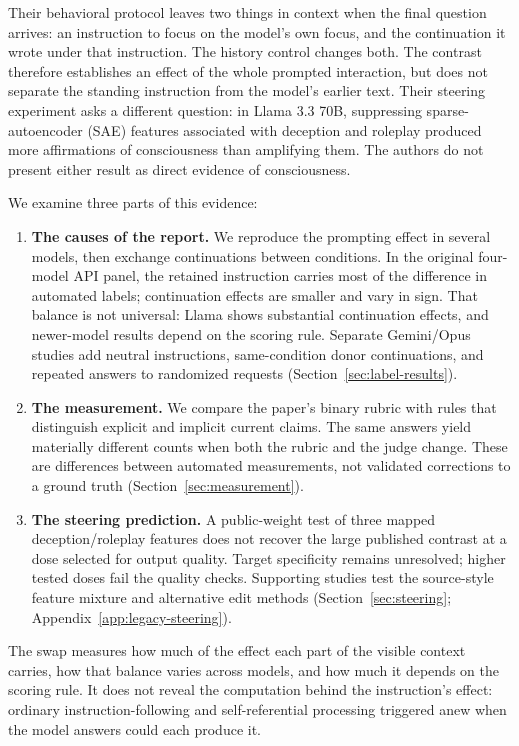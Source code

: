 \documentclass[11pt]{article}
\begin{document}
Their behavioral protocol leaves two things in context when the final
question arrives: an instruction to focus on the model's own focus, and the
continuation it wrote under that instruction. The history control changes
both. The contrast therefore establishes an effect of the whole prompted
interaction, but does not separate the standing instruction from the model's
earlier text. Their steering experiment asks a different question: in Llama
3.3 70B, suppressing sparse-autoencoder (SAE) features associated with
deception and roleplay produced
more affirmations of consciousness than amplifying them. The authors do not
present either result as direct evidence of consciousness.

We examine three parts of this evidence:
\begin{enumerate}
\item \textbf{The causes of the report.} We reproduce the prompting effect
in several models, then exchange continuations between conditions. In the
original four-model API panel, the retained instruction carries most of the
difference in automated labels; continuation effects are smaller and vary
in sign. That balance is not universal: Llama shows substantial continuation
effects, and newer-model results depend on the scoring rule. Separate
Gemini/Opus studies add neutral instructions, same-condition donor
continuations, and repeated answers to randomized requests
(Section~\ref{sec:label-results}).
\item \textbf{The measurement.} We compare the paper's binary rubric with
rules that distinguish explicit and implicit current claims. The same
answers yield materially different counts when both the rubric and the
judge change. These are differences between automated measurements, not
validated corrections to a ground truth
(Section~\ref{sec:measurement}).
\item \textbf{The steering prediction.} A public-weight test of three
mapped deception/roleplay features does not recover the large published
contrast at a dose selected for output quality. Target specificity remains
unresolved; higher tested doses fail the quality checks. Supporting studies
test the source-style feature mixture and alternative edit methods
(Section~\ref{sec:steering}; Appendix~\ref{app:legacy-steering}).
\end{enumerate}

The swap measures how much of the effect each part of the visible context
carries, how that balance varies across models, and how much it depends on
the scoring rule. It does not reveal the computation behind the
instruction's effect: ordinary instruction-following and self-referential
processing triggered anew when the model answers could each produce it.
\end{document}
